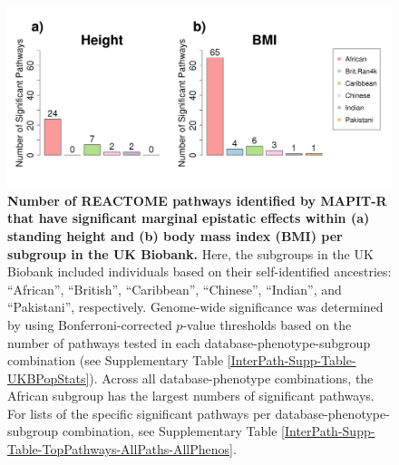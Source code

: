 \documentclass[10pt]{article}
\begin{document}
\begin{figure}[htbp]
\centering
\includegraphics[width = \textwidth]{Images/Supp/InterPath_Supp_Figure_Barplots_REACTOME_vs4.png}
\caption{\textbf{Number of REACTOME pathways identified by MAPIT-R that have significant marginal epistatic effects within (a) standing height and (b) body mass index (BMI) per subgroup in the UK Biobank.} Here, the subgroups in the UK Biobank included individuals based on their self-identified ancestries: ``African'', ``British'', ``Caribbean'', ``Chinese'', ``Indian'', and ``Pakistani'', respectively. Genome-wide significance was determined by using Bonferroni-corrected $p$-value thresholds based on the number of pathways tested in each database-phenotype-subgroup combination (see Supplementary Table \ref{InterPath-Supp-Table-UKBPopStats}). Across all database-phenotype combinations, the African subgroup has the largest numbers of significant pathways. For lists of the specific significant pathways per database-phenotype-subgroup combination, see Supplementary Table \ref{InterPath-Supp-Table-TopPathways-AllPaths-AllPhenos}.}
\label{InterPath-Supp-Figure-Barplots-REACTOME}
\end{figure}
\clearpage
\end{document}
